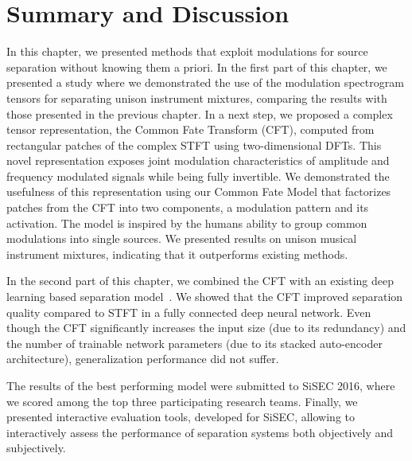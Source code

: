 \section{Summary and Discussion}


In this chapter, we presented methods that exploit modulations for source separation without knowing them a priori. 
In the first part of this chapter, we presented a study where we demonstrated the use of the modulation spectrogram tensors for separating unison instrument mixtures, comparing the results with those presented in the previous chapter.
In a next step, we proposed a complex tensor representation, the Common Fate Transform (CFT), computed from rectangular patches of the complex STFT using two-dimensional DFTs.
This novel representation exposes joint modulation characteristics of amplitude and frequency modulated signals while being fully invertible.
We demonstrated the usefulness of this representation using our Common Fate Model that factorizes patches from the CFT into two components, a modulation pattern and its activation. 
The model is inspired by the humans ability to group common modulations into single sources.
We presented results on unison musical instrument mixtures, indicating that it outperforms existing methods.
\par
In the second part of this chapter, we combined the CFT with an existing deep learning based separation model~\cite{uhlich15}.
We showed that the CFT improved separation quality compared to STFT in a fully connected deep neural network.
Even though the CFT significantly increases the input size (due to its redundancy) and the number of trainable network parameters (due to its stacked auto-encoder architecture), generalization performance did not suffer.
\par
The results of the best performing model were submitted to SiSEC 2016, where we scored among the top three participating research teams.
Finally, we presented interactive evaluation tools, developed for SiSEC, allowing to interactively assess the performance of separation systems both objectively and subjectively.